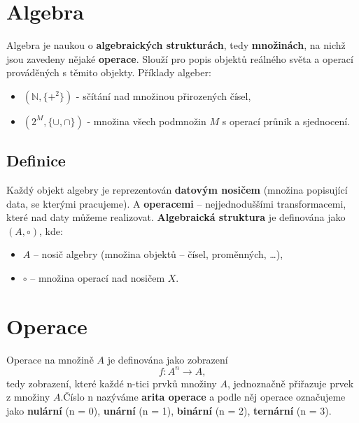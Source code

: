 \section{Algebra}
Algebra je naukou o \textbf{algebraických strukturách}, tedy \textbf{množinách}, na nichž jsou zavedeny nějaké \textbf{operace}. Slouží pro popis objektů reálného světa a operací prováděných s těmito objekty. Příklady algeber:
\begin{itemize}
    \item $( \mathbb{N} , \{+^2\} )$ - sčítání nad množinou přirozených čísel,
    \item $ ( 2^M , \{\cup, \cap\} ) $ - množina všech podmnožin $ M $ s operací průnik a sjednocení.
\end{itemize}

\subsection{Definice}
Každý objekt algebry je reprezentován \textbf{datovým nosičem} (množina popisující data, se kterými pracujeme). A \textbf{operacemi} -- nejjednoduššími transformacemi, které nad daty můžeme realizovat. \textbf{Algebraická struktura} je definována jako $(A, \circ)$, kde:
\begin{itemize}
    \item $A$ -- nosič algebry (množina objektů -- čísel, proměnných, \ldots),
    \item $\circ$ -- množina operací nad nosičem $ X $.
\end{itemize}

\section{Operace}
Operace na množině $A$ je definována jako zobrazení
\begin{equation}
    f: A^n \rightarrow A,
\end{equation}
tedy zobrazení, které každé n-tici prvků množiny $A$, jednoznačně přiřazuje prvek z množiny $A$.Číslo n nazýváme \textbf{arita operace} a podle něj operace označujeme jako \textbf{nulární} (n = 0), \textbf{unární} (n = 1), \textbf{binární} (n = 2), \textbf{ternární} (n = 3).

